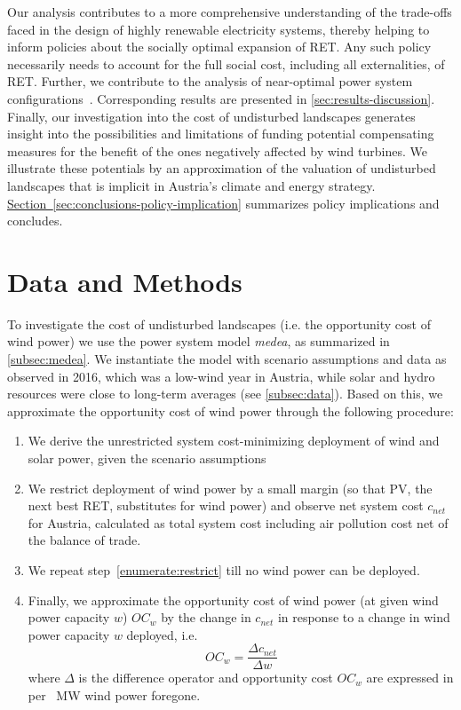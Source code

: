 \documentclass[review, 3p, times, 12pt, authoryear]{elsarticle}
\begin{document}
    Our analysis contributes to a more comprehensive understanding of the trade-offs faced in the design of highly renewable electricity systems, thereby helping to inform policies about the socially optimal expansion of RET.
    Any such policy necessarily needs to account for the full social cost, including all externalities, of RET.
    Further, we contribute to the analysis of near-optimal power system configurations~\citep[see e.g.][]{Neumann2019, Schlachtberger2017}.
    Corresponding results are presented in \autoref{sec:results-discussion}.
    Finally, our investigation into the cost of undisturbed landscapes generates insight into the possibilities and limitations of funding potential compensating measures for the benefit of the ones negatively affected by wind turbines.
    We illustrate these potentials by an approximation of the valuation of undisturbed landscapes that is implicit in Austria's climate and energy strategy.
    \hyperref[sec:conclusions-policy-implication]{Section~\ref*{sec:conclusions-policy-implication}} summarizes policy implications and concludes.



    \section{Data and Methods} \label{sec:data-and-methods}
    To investigate the cost of undisturbed landscapes (i.e. the opportunity cost of wind power) we use the power system model \emph{medea}, as summarized in \autoref{subsec:medea}.
    We instantiate the model with scenario assumptions and data as observed in 2016, which was a low-wind year in Austria, while solar and hydro resources were close to long-term averages (see \autoref{subsec:data}).
    Based on this, we approximate the opportunity cost of wind power through the following procedure:
    \begin{enumerate}
        \item We derive the unrestricted system cost-minimizing deployment of wind and solar power, given the scenario assumptions
        \item We restrict deployment of wind power by a small margin (so that PV, the next best RET, substitutes for wind power) and observe net system cost $c_{net}$ for Austria, calculated as total system cost including air pollution cost net of the balance of trade.\label{enumerate:restrict}
        \item We repeat step~\ref{enumerate:restrict} till no wind power can be deployed.
        \item Finally, we approximate the opportunity cost of wind power (at given wind power capacity $w$) $OC_w$ by the change in $c_{net}$ in response to a change in wind power capacity $w$ deployed, i.e.\ \[OC_w = \frac{\Delta c_{net}}{\Delta w}\]
        where $\Delta$ is the difference operator and opportunity cost $OC_w$ are expressed in \EUR per \SI{}{\mega\watt} wind power foregone.
    \end{enumerate}
\end{document}
